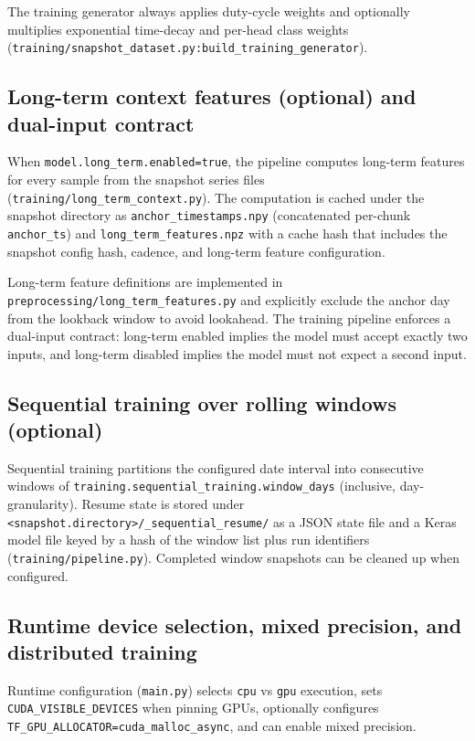 \documentclass[11pt]{article}
\begin{document}
The training generator always applies duty-cycle weights and optionally multiplies exponential time-decay and per-head class weights (\texttt{training/snapshot\_dataset.py:build\_training\_generator}).

\subsection{Long-term context features (optional) and dual-input contract}

When \texttt{model.long\_term.enabled=true}, the pipeline computes long-term features for every sample from the snapshot series files (\texttt{training/long\_term\_context.py}). The computation is cached under the snapshot directory as \texttt{anchor\_timestamps.npy} (concatenated per-chunk \texttt{anchor\_ts}) and \texttt{long\_term\_features.npz} with a cache hash that includes the snapshot config hash, cadence, and long-term feature configuration.

Long-term feature definitions are implemented in \texttt{preprocessing/long\_term\_features.py} and explicitly exclude the anchor day from the lookback window to avoid lookahead. The training pipeline enforces a dual-input contract: long-term enabled implies the model must accept exactly two inputs, and long-term disabled implies the model must not expect a second input.

\subsection{Sequential training over rolling windows (optional)}

Sequential training partitions the configured date interval into consecutive windows of \texttt{training.sequential\_training.window\_days} (inclusive, day-granularity). Resume state is stored under \texttt{<snapshot.directory>/\_sequential\_resume/} as a JSON state file and a Keras model file keyed by a hash of the window list plus run identifiers (\texttt{training/pipeline.py}). Completed window snapshots can be cleaned up when configured.

\subsection{Runtime device selection, mixed precision, and distributed training}

Runtime configuration (\texttt{main.py}) selects \texttt{cpu} vs \texttt{gpu} execution, sets \texttt{CUDA\_VISIBLE\_DEVICES} when pinning GPUs, optionally configures \texttt{TF\_GPU\_ALLOCATOR=cuda\_malloc\_async}, and can enable mixed precision.
\end{document}
